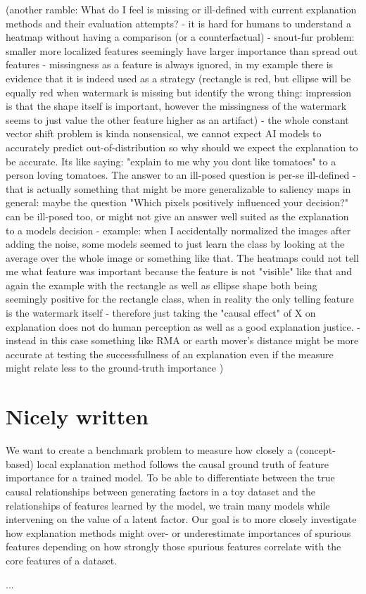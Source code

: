 (another ramble:
What do I feel is missing or ill-defined with current explanation methods and their evaluation attempts?
- it is hard for humans to understand a heatmap without having a comparison (or a counterfactual)
- snout-fur problem: smaller more localized features seemingly have larger importance than spread out features
- missingness as a feature is always ignored, in my example there is evidence that it is indeed used as a strategy (rectangle is red, but ellipse will be equally red when watermark is missing but identify the wrong thing: impression is that the shape itself is important, however the missingness of the watermark seems to just value the other feature higher as an artifact)
- the whole constant vector shift problem is kinda nonsensical, we cannot expect AI models to accurately predict out-of-distribution so why should we expect the explanation to be accurate. Its like saying: "explain to me why you dont like tomatoes" to a person loving tomatoes. The answer to an ill-posed question is per-se ill-defined
- that is actually something that might be more generalizable to saliency maps in general: maybe the question "Which pixels positively influenced your decision?" can be ill-posed too, or might not give an answer well suited as the explanation to a models decision
- example: when I accidentally normalized the images after adding the noise, some models seemed to just learn the class by looking at the average over the whole image or something like that. The heatmaps could not tell me what feature was important because the feature is not "visible" like that
and again the example with the rectangle as well as ellipse shape both being seemingly positive for the rectangle class, when in reality the only telling feature is the watermark itself
- therefore just taking the "causal effect" of X on explanation does not do human perception as well as a good explanation justice.
- instead in this case something like RMA or earth mover's distance might be more accurate at testing the successfullness of an explanation even if the measure might relate less to the ground-truth importance
)


\section{Nicely written}

We want to create a benchmark problem to measure how closely a (concept-based) local explanation method follows the causal ground truth of feature importance for a trained model. 
To be able to differentiate between the true causal relationships between generating factors in a toy dataset and the relationships of features learned by the model, we train many models while intervening on the value of a latent factor. 
Our goal is to more closely investigate how explanation methods might over- or underestimate importances of spurious features depending on how strongly those spurious features correlate with the core features of a dataset. 

...